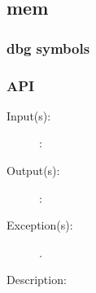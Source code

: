 %
%
%
%
%              

\subsection{mem}
\label{mem}

\subsubsection{dbg symbols}

\subsubsection{API}
\begin{description}
\label{mem_}
\item[{\cfunc[]{mem\_}{}}: ]
	\begin{description}\item[]
	\item[Input(s): ]
		\begin{description}\item[]
		\item[: ]
		\end{description}
	\item[Output(s): ]
		\begin{description}\item[]
		\item[: ]
		\end{description}
	\item[Exception(s): ]
		\begin{description}\item[]
		\item[.]
		\end{description}
	\item[Description: ]
	\end{description}
\end{description}
